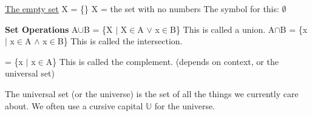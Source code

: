 \documentclass{article}
\begin{document}
\underline{The empty set}\newline
X = \{\}\newline
X = the set with no numbers\newline
The symbol for this: $\emptyset$\newline\newline


\textbf{Set Operations}\newline
A$\cup$B = \{X $\mid$ X$\in$A $\lor$ x$\in$B\} This is called a union.\newline
A$\cap$B = \{x $\mid$ x$\in$A $\wedge$ x$\in$B\} This is called the intersection. \newline

 = \{x $\mid$ x$\in$A\} This is called the complement. (depends on context, or the universal set) \newline\newline

The universal set (or the universe) is the set of all the things we currently care about. We often use a cursive capital $\mathbb{U}$ for the universe.



\enddocument
\end{document}
